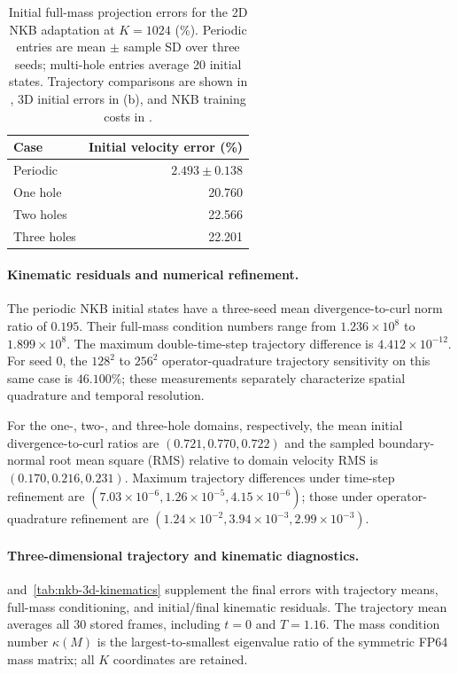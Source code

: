 \begin{table}[!htb]
\centering\small
\caption{Initial full-mass projection errors for the 2D NKB adaptation at $K=1024$ (\%). Periodic entries are mean $\pm$ sample SD over three seeds; multi-hole entries average 20 initial states. Trajectory comparisons are shown in , 3D initial errors in (b), and NKB training costs in .}
\label{tab:nkb-matched}
\begin{tabular}{lr}\toprule
Case&Initial velocity error (\%)\\\midrule
Periodic &$2.493\pm0.138$\\
One hole&20.760\\
Two holes&22.566\\
Three holes&22.201\\
\bottomrule\end{tabular}
\end{table}

\paragraph{Kinematic residuals and numerical refinement.}
The periodic NKB initial states have a three-seed mean divergence-to-curl norm ratio of $0.195$. Their full-mass condition numbers range from $1.236\times10^{8}$ to $1.899\times10^{8}$. The maximum double-time-step trajectory difference is $4.412\times10^{-12}$. For seed 0, the $128^2$ to $256^2$ operator-quadrature trajectory sensitivity on this same case is $46.100\%$; these measurements separately characterize spatial quadrature and temporal resolution.

For the one-, two-, and three-hole domains, respectively, the mean initial divergence-to-curl ratios are $(0.721,0.770,0.722)$ and the sampled boundary-normal root mean square (RMS) relative to domain velocity RMS is $(0.170,0.216,0.231)$. Maximum trajectory differences under time-step refinement are $(7.03\times10^{-6},1.26\times10^{-5},4.15\times10^{-6})$; those under operator-quadrature refinement are $(1.24\times10^{-2},3.94\times10^{-3},2.99\times10^{-3})$.

\paragraph{Three-dimensional trajectory and kinematic diagnostics.}
 and~\ref{tab:nkb-3d-kinematics} supplement the final errors with trajectory means, full-mass conditioning, and initial/final kinematic residuals. The trajectory mean averages all 30 stored frames, including $t=0$ and $T=1.16$. The mass condition number $\kappa(M)$ is the largest-to-smallest eigenvalue ratio of the symmetric FP64 mass matrix; all $K$ coordinates are retained.

